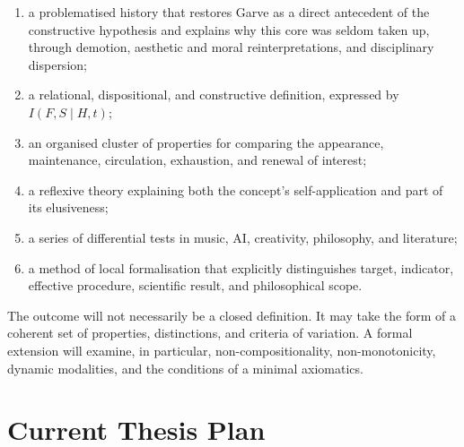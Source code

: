 \documentclass[11pt,a4paper]{article}
\begin{document}
\begin{enumerate}
  \item a problematised history that restores Garve as a direct antecedent of
        the constructive hypothesis and explains why this core was seldom taken
        up, through demotion, aesthetic and moral reinterpretations, and disciplinary
        dispersion;
  \item a relational, dispositional, and constructive definition, expressed by
        \(I(F,S\mid H,t)\);
  \item an organised cluster of properties for comparing the appearance,
        maintenance, circulation, exhaustion, and renewal of interest;
  \item a reflexive theory explaining both the concept's self-application and
        part of its elusiveness;
  \item a series of differential tests in music, AI, creativity, philosophy,
        and literature;
  \item a method of local formalisation that explicitly distinguishes target,
        indicator, effective procedure, scientific result, and philosophical
        scope.
\end{enumerate}

The outcome will not necessarily be a closed definition. It may take the form
of a coherent set of properties, distinctions, and criteria of
variation. A formal extension will examine, in particular,
non-compositionality, non-monotonicity, dynamic modalities, and the conditions
of a minimal axiomatics.

\section{Current Thesis Plan}
\end{document}
